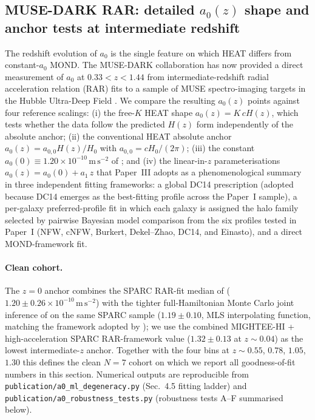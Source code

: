 \documentclass[twocolumn,letterpaper]{aastex631}
\newcommand{\azero}{a_0}
\newcommand{\azerolocal}{a_{0,0}}
\begin{document}
\subsection{MUSE-DARK RAR: detailed $\azero(z)$
  shape and anchor tests at intermediate
  redshift}\label{sec:a0z}

The redshift evolution of $\azero$ is the single feature on
which HEAT differs from constant-$\azero$ MOND.  The MUSE-DARK
collaboration has now provided a direct measurement of $\azero$
at $0.33\!<\!z\!<\!1.44$ from intermediate-redshift radial
acceleration relation (RAR) fits to a sample of MUSE
spectro-imaging targets in the Hubble Ultra-Deep Field
\citep{Ciocan2026RAR}.  We compare the resulting $\azero(z)$
points against four reference scalings: (i) the free-$K$ HEAT
shape $\azero(z)=K\,cH(z)$, which tests whether the data follow
the predicted $H(z)$ form independently of the absolute anchor;
(ii) the conventional HEAT absolute anchor
$\azero(z)\!=\!\azerolocal H(z)/H_0$ with
$\azerolocal=cH_0/(2\pi)$; (iii) the constant
$\azero(0)\!\equiv\!1.20\!\times\!10^{-10}\,\mathrm{m\,s^{-2}}$
of \citet{McGaugh2016}; and (iv) the linear-in-$z$
parameterisations $\azero(z)\!=\!a_{0}(0)\!+\!a_{1}\,z$ that
Paper~III adopts as a phenomenological summary in three
independent fitting frameworks: a global DC14 prescription
(adopted because DC14 emerges as the best-fitting profile across
the Paper~I sample), a per-galaxy preferred-profile fit in which
each galaxy is assigned the halo family selected by pairwise
Bayesian model comparison from the six profiles tested in
Paper~I (NFW, cNFW, Burkert, Dekel--Zhao, DC14, and Einasto), and
a direct MOND-framework fit.

\paragraph{Clean cohort.}  The $z\!=\!0$ anchor combines the
SPARC RAR-fit median of \citet{McGaugh2016}
($1.20\!\pm\!0.26\!\times\!10^{-10}\,\mathrm{m\,s^{-2}}$) with
the tighter full-Hamiltonian Monte Carlo joint inference of
\citet{Desmond2023} on the same SPARC sample
($1.19\!\pm\!0.10$, MLS interpolating function, matching the
framework adopted by \citealt{Ciocan2026RAR}); we use the
\citet{Varasteanu2025} combined MIGHTEE-HI + high-acceleration
SPARC RAR-framework value
($1.32\!\pm\!0.13$ at $z\!\sim\!0.04$) as the lowest
intermediate-$z$ anchor.  Together with the four
\citet{Ciocan2026RAR} bins at $z\!\sim\!0.55$, $0.78$, $1.05$,
$1.30$ this defines the clean $N\!=\!7$ cohort on which we report
all goodness-of-fit numbers in this section.  Numerical outputs
are reproducible from
\texttt{publication/a0\_ml\_degeneracy.py} (Sec.~4.5 fitting
ladder) and \texttt{publication/a0\_robustness\_tests.py}
(robustness tests A--F summarised below).
\end{document}
